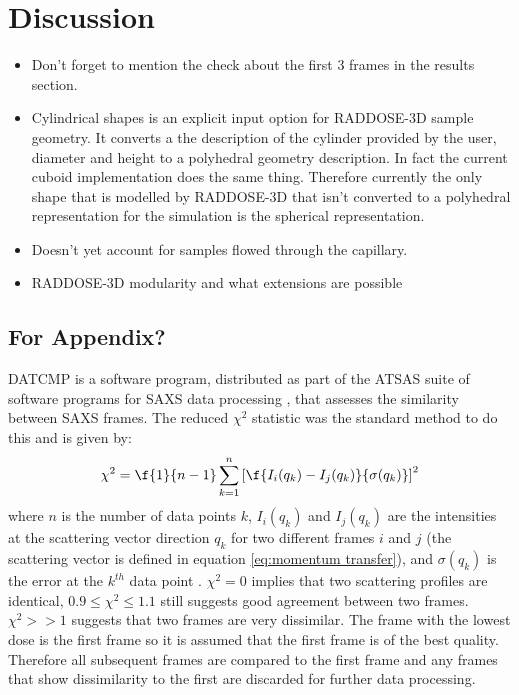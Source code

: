 \section{Discussion}
\label{sec:Discussion}
\begin{itemize}
    \item Don't forget to mention the check about the first 3 frames in the results section.
    \item Cylindrical shapes is an explicit input option for RADDOSE-3D sample geometry. It converts a the description of the cylinder provided by the user, diameter and height to a polyhedral geometry description. In fact the current cuboid implementation does the same thing. Therefore currently the only shape that is modelled by RADDOSE-3D that isn't converted to a polyhedral representation for the simulation is the spherical representation.
    \item Doesn't yet account for samples flowed through the capillary.
    \item RADDOSE-3D modularity and what extensions are possible
\end{itemize}

\subsection{For Appendix?}
\label{sub:For Appendix?}
DATCMP is a software program, distributed as part of the ATSAS suite of software programs for SAXS data processing \cite{petoukhov2012new}, that assesses the similarity between SAXS frames.
The reduced $\chi^2$ statistic \cite{pearson1900x} was the standard method to do this and is given by:
\begin{equation}
    \chi^2 = \f{1}{n-1} \sum_{k=1}^{n}\left[ \f{I_i(q_k) - I_j(q_k)}{\sigma(q_k)}\right]^2
\end{equation}
where $n$ is the number of data points $k$, $I_i(q_k)$ and $I_j(q_k)$ are the intensities at the scattering vector direction $q_k$ for two different frames $i$ and $j$ (the scattering vector is defined in equation \ref{eq:momentum transfer}), and $\sigma(q_k)$ is the error at the $k^{th}$ data point \cite{franke2015synchrotron}.
$\chi^2 = 0$ implies that two scattering profiles are identical, $0.9 \le \chi^2 \le 1.1$ still suggests good agreement between two frames.
$\chi^2 >> 1$ suggests that two frames are very dissimilar.
The frame with the lowest dose is the first frame so it is assumed that the first frame is of the best quality.
Therefore all subsequent frames are compared to the first frame and any frames that show dissimilarity to the first are discarded for further data processing.
